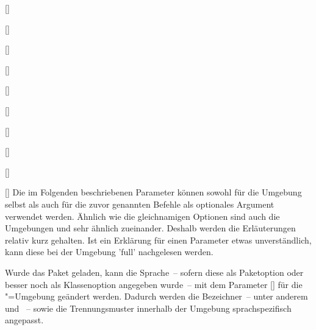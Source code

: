 \begin{Declaration*}{}
\begin{Declaration*}{}
\begin{Declaration*}{}
\begin{Declaration}[v2.02]{[]}
\begin{Declaration}[v2.04]{%
}
\begin{Declaration}{[]}
\begin{Declaration}[v2.02]{%
  []%
}
\begin{Declaration}[v2.02]{%
  []%
}
\begin{Declaration}[v2.02]{%
  []%
}
\begin{Declaration}{[\PSet]}
\begin{Declaration}{%
  []
}
\begin{Declaration}{[]}
\begin{Declaration}{[]}
\begin{Declaration}{[]}
Die im Folgenden beschriebenen Parameter können sowohl für die Umgebung 
 selbst als auch für die zuvor genannten Befehle als 
optionales Argument verwendet werden. Ähnlich wie die gleichnamigen Optionen 
sind auch die Umgebungen  und  
sehr ähnlich zueinander. Deshalb werden die Erläuterungen relativ kurz 
gehalten. Ist ein Erklärung für einen Parameter etwas unverständlich, kann 
diese bei der Umgebung 'full' nachgelesen werden.

Wurde das Paket  geladen, kann die Sprache~-- sofern diese als 
Paketoption oder besser noch als Klassenoption angegeben wurde~-- mit dem 
Parameter [] für die 
"=Umgebung geändert werden. Dadurch werden die 
Bezeichner~-- unter anderem  und ~-- 
sowie die Trennungsmuster innerhalb der Umgebung sprachspezifisch angepasst. 


\end{Declaration}
\end{Declaration}
\end{Declaration}
\end{Declaration}
\end{Declaration}
\end{Declaration}
\end{Declaration}
\end{Declaration}
\end{Declaration}
\end{Declaration}
\end{Declaration}
\end{Declaration*}
\end{Declaration*}
\end{Declaration*}
